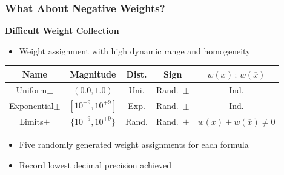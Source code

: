 \documentclass[t,pdf]{beamer}
\newcommand{\obar}[1]{\overline{#1}}
\newcommand{\rtext}[1]{\textcolor{xred}{#1}}
\begin{document}
\begin{frame}
  \frametitle{What About Negative Weights?}

\medskip

  \textbf{Difficult Weight Collection}

\medskip

  \begin{itemize}
  \item
    Weight assignment with high dynamic range and homogeneity
  \end{itemize}

\medskip

\begin{center}
   \begin{tabular}{ccccc}
     Name & Magnitude  & Dist. & Sign & $w(x)\,:\,w(\obar{x})$ \\
     \midrule
     Uniform$\pm$      & $(0.0, 1.0)$     & Uni.  & Rand.~$\pm$   & Ind. \\[0.5em]
     Exponential$\pm$ & $[10^{-9}, 10^{+9}]$ & Exp. & Rand.~$\pm$ & Ind. \\[0.5em]
     \rtext{Limits$\pm$} & \rtext{$\{10^{-9}, 10^{+9}\}$} & \rtext{Rand.} & \rtext{Rand.~$\pm$} & \rtext{$w(x) + w(\obar{x}) \not = 0$} \\
   \end{tabular}
\end{center}

\medskip

  \begin{itemize}
    \item Five randomly generated weight assignments for each formula
    \item Record lowest decimal precision achieved
  \end{itemize}

\end{frame}
\end{document}
